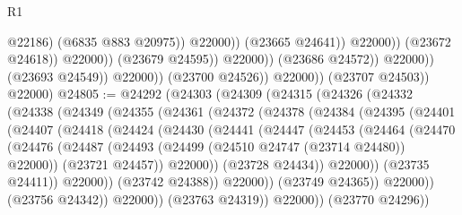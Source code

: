 \begin{lexlean}{R1}
\begin{coremodule}
                                                    @22186)
                                                  (@6835 @883 @20975))
                                                @22000))
                                            (@23665 @24641))
                                          @22000))
                                      (@23672 @24618))
                                    @22000))
                                (@23679 @24595))
                              @22000))
                          (@23686 @24572))
                        @22000))
                    (@23693 @24549))
                  @22000))
              (@23700 @24526))
            @22000))
        (@23707 @24503))
      @22000)
@24805 := @24292
    (@24303
      (@24309
        (@24315
          (@24326
            (@24332
              (@24338
                (@24349
                  (@24355
                    (@24361
                      (@24372
                        (@24378
                          (@24384
                            (@24395
                              (@24401
                                (@24407
                                  (@24418
                                    (@24424
                                      (@24430
                                        (@24441
                                          (@24447
                                            (@24453
                                              (@24464
                                                (@24470
                                                  (@24476
                                                    (@24487
                                                      (@24493
                                                        (@24499
                                                          (@24510 @24747 (@23714 @24480))
                                                          @22000))
                                                      (@23721 @24457))
                                                    @22000))
                                                (@23728 @24434))
                                              @22000))
                                          (@23735 @24411))
                                        @22000))
                                    (@23742 @24388))
                                  @22000))
                              (@23749 @24365))
                            @22000))
                        (@23756 @24342))
                      @22000))
                  (@23763 @24319))
                @22000))
            (@23770 @24296))

\end{coremodule}
\end{lexlean}
